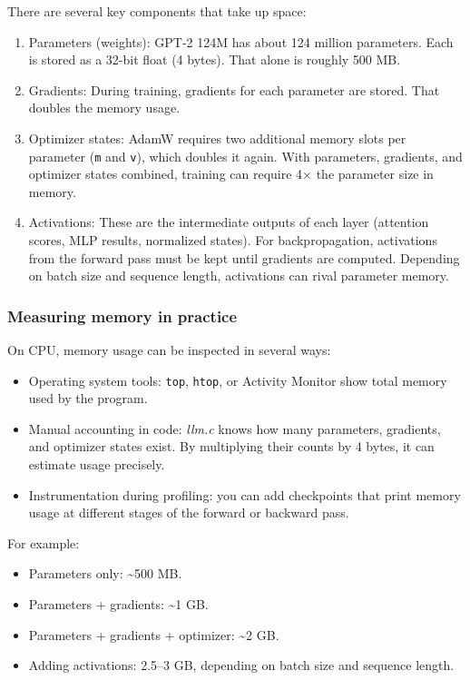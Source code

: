 \documentclass[
  letterpaper,
  DIV=11,
  numbers=noendperiod]{scrreprt}
\providecommand{\tightlist}{%
  \setlength{\itemsep}{0pt}\setlength{\parskip}{0pt}}
\begin{document}
There are several key components that take up space:

\begin{enumerate}
\def\labelenumi{\arabic{enumi}.}
\item
  Parameters (weights): GPT-2 124M has about 124 million parameters.
  Each is stored as a 32-bit float (4 bytes). That alone is roughly 500
  MB.
\item
  Gradients: During training, gradients for each parameter are stored.
  That doubles the memory usage.
\item
  Optimizer states: AdamW requires two additional memory slots per
  parameter (\texttt{m} and \texttt{v}), which doubles it again. With
  parameters, gradients, and optimizer states combined, training can
  require 4× the parameter size in memory.
\item
  Activations: These are the intermediate outputs of each layer
  (attention scores, MLP results, normalized states). For
  backpropagation, activations from the forward pass must be kept until
  gradients are computed. Depending on batch size and sequence length,
  activations can rival parameter memory.
\end{enumerate}

\subsubsection{Measuring memory in
practice}\label{measuring-memory-in-practice}

On CPU, memory usage can be inspected in several ways:

\begin{itemize}
\tightlist
\item
  Operating system tools: \texttt{top}, \texttt{htop}, or Activity
  Monitor show total memory used by the program.
\item
  Manual accounting in code: \emph{llm.c} knows how many parameters,
  gradients, and optimizer states exist. By multiplying their counts by
  4 bytes, it can estimate usage precisely.
\item
  Instrumentation during profiling: you can add checkpoints that print
  memory usage at different stages of the forward or backward pass.
\end{itemize}

For example:

\begin{itemize}
\tightlist
\item
  Parameters only: \textasciitilde500 MB.
\item
  Parameters + gradients: \textasciitilde1 GB.
\item
  Parameters + gradients + optimizer: \textasciitilde2 GB.
\item
  Adding activations: 2.5--3 GB, depending on batch size and sequence
  length.
\end{itemize}
\end{document}
